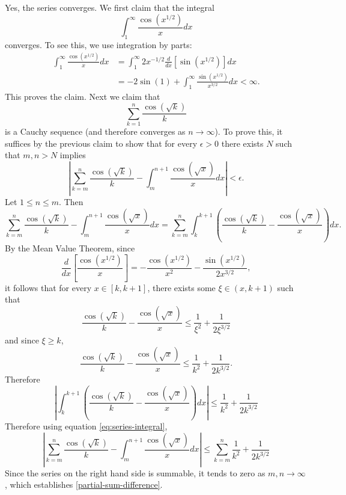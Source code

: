 \documentclass[answers]{exam}
\theoremstyle{problemstyle}
\newcommand{\1}[1]{\textbf{1}_{\left[#1\right]}} %
\def\({\left (}
\def\){\right )}
\begin{document}
\begin{questions}
\begin{solution}
Yes, the series converges. We first claim that the integral
%
\[ \int_{1}^{\infty}\frac{\cos(x^{1/2})}{x}dx \]
%
converges. To see this, we use integration by parts:
  \begin{align*}
    \int_{1}^{\infty}\frac{\cos(x^{1/2})}{x}dx
    &= \int_{1}^{\infty}2x^{-1/2}\frac{d}{dx}\left[ \sin(x^{1/2}) \right]dx\\
    &= -2\sin(1)+ \int_{1}^{\infty}\frac{\sin(x^{1/2})}{x^{3/2}}dx<\infty.
  \end{align*}
  This proves the claim. Next we claim that
  \[ \sum_{k=1}^{n} \frac{\cos(\sqrt{k})}{k} \]
  is a Cauchy sequence (and therefore converges as $n\to\infty$). To prove this, it suffices by the previous claim to show that for every $\epsilon>0$ there exists $N$ such that $m,n>N$ implies 
  \begin{equation}\label{partial-sum-difference}
    \left|\sum_{k=m}^{n}\frac{\cos(\sqrt{k})}{k} - \int_{m}^{n+1}\frac{\cos(\sqrt{x})}{x}dx\right|<\epsilon.
  \end{equation}
  Let $1\leq n \leq m$. Then
  \begin{equation}\label{eq:series-integral}
    \sum_{k=m}^{n}\frac{\cos(\sqrt{k})}{k} - \int_{m}^{n+1}\frac{\cos(\sqrt{x})}{x}dx
    = \sum_{k=m}^{n}\int_{k}^{k+1}\(\frac{\cos(\sqrt{k})}{k} - \frac{\cos(\sqrt{x})}{x}\)dx.
  \end{equation}
  By the Mean Value Theorem, since
  \[ \frac{d}{dx}\left[ \frac{\cos(x^{1/2})}{x} \right]= -\frac{\cos(x^{1/2})}{x^{2}} - \frac{\sin(x^{1/2})}{2x^{3/2}}, \]
  it follows that for every $x\in [k,k+1]$, there exists some $\xi\in (x,k+1)$ such that
  \begin{equation*}
    \frac{\cos(\sqrt{k})}{k} - \frac{\cos(\sqrt{x})}{x} \leq \frac{1}{\xi^{2}}+ \frac{1}{2\xi^{3/2}}
  \end{equation*}
  and since $\xi \geq k$,
  \begin{equation*}
     \frac{\cos(\sqrt{k})}{k} - \frac{\cos(\sqrt{x})}{x} \leq\frac{1}{k^{2}} + \frac{1}{2k^{3/2}}.
   \end{equation*}
   Therefore
  \begin{equation*}
    \left|\int_{k}^{k+1}\(\frac{\cos(\sqrt{k})}{k} - \frac{\cos(\sqrt{x})}{x}\)dx\right| \leq  \frac{1}{k^{2}} + \frac{1}{2k^{3/2}}
  \end{equation*}
  Therefore using equation \eqref{eq:series-integral},
  \begin{equation*}
    \left| \sum_{k=m}^{n}\frac{\cos(\sqrt{k})}{k} - \int_{m}^{n+1}\frac{\cos(\sqrt{x})}{x}dx \right| \leq \sum_{k=m}^{n}\frac{1}{k^{2}} + \frac{1}{2k^{3/2}}
  \end{equation*}
  Since the series on the right hand side is summable, it tends to zero as $m,n\to\infty$, which establishes \eqref{partial-sum-difference}.
\end{solution}





\end{questions}
\end{document}
